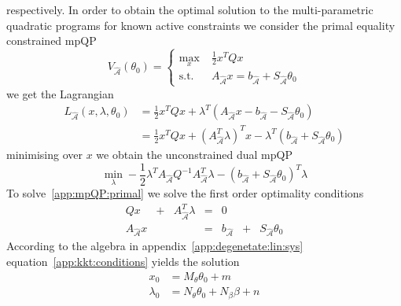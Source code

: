 respectively.
%
In order to obtain the optimal solution to the multi-parametric quadratic programs for known
active constraints we consider the primal equality constrained mpQP 
%
\begin{equation}\label{app:mpQP:primal}
	V_{\hat{\mathcal A}}(\theta_0) = \left\{\begin{split}
		\max_x & \;\frac{1}{2} x^T Q x\\
		\text{s.t.} &\; A_{\hat{\mathcal A}}x  = b_{\hat{\mathcal A}} +S_{\hat{\mathcal A}}\theta_0
	\end{split}\right.
\end{equation}
%
we get the Lagrangian
%
\begin{equation}\begin{split}
	L_{\hat{\mathcal A}}(x,\lambda,\theta_0)  &= \frac{1}{2} x^T Q x + \lambda^T\left(A_{\hat{\mathcal A}}x - 
	b_{\hat{\mathcal A}} - S_{\hat{\mathcal A}}\theta_0\right)\\
	&=\frac{1}{2} x^T Q x + \left(A_{\hat{\mathcal A}}^T\lambda\right)^Tx 
	-\lambda^T \left(b_{\hat{\mathcal A}} + S_{\hat{\mathcal A}}\theta_0\right)
\end{split}\end{equation}
%
minimising over $x$ we obtain the unconstrained dual mpQP
%
\begin{equation}\label{app:mpQP:dual}
	\min_\lambda -\frac{1}{2}\lambda^T A_{\hat{\mathcal A}} Q^{-1}A_{\hat{\mathcal A}}^T \lambda 
	-(b_{\hat{\mathcal A}} + S_{\hat{\mathcal A}}\theta_0)^T\lambda
\end{equation}
%
To solve~\eqref{app:mpQP:primal} we solve the first order optimality conditions
%
\begin{equation}\label{app:kkt:conditions}
	\begin{array}{ccccccc}
		Q x &+& A^T_{\hat{\mathcal A}}\lambda & = & 0&& \\
		A_{\hat{\mathcal A}} x & & & = & b_{\hat{\mathcal A}}& +& S_{\hat{\mathcal A}}\theta_0
	\end{array}
\end{equation}
%
According to the algebra in appendix~\ref{app:degenetate:lin:sys} equation~\eqref{app:kkt:conditions} yields
the solution
%
\begin{equation}\label{app:mpQP:solution}
	\begin{split}
	x_0 &= M_\theta \theta_0 + m\\
	\lambda_0 &= N_\theta \theta_0 + N_\beta \beta + n
	\end{split}
\end{equation}
